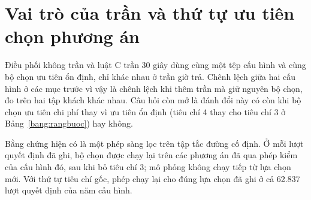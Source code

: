 
\section{Vai trò của trần và thứ tự ưu tiên chọn phương án}
\label{muc:c4-vaitro}

Điều phối không trần và luật C trần 30 giây dùng cùng một tệp cấu hình và cùng bộ chọn ưu tiên ổn định, chỉ
khác nhau ở trần giờ trả. Chênh lệch giữa hai cấu hình ở các mục trước vì vậy là chênh lệch khi thêm trần mà giữ
nguyên bộ chọn, đo trên hai tập khách khác nhau. Câu hỏi còn mở là đánh đổi này có còn khi bộ chọn ưu tiên chi phí
thay vì ưu tiên ổn định (tiêu chí 4 thay cho tiêu chí 3 ở Bảng~\ref{bang:rangbuoc}) hay không.

Bằng chứng hiện có là một phép sàng lọc trên tập tắc đường cố định. Ở mỗi lượt quyết định đã ghi, bộ chọn được
chạy lại trên các phương án đã qua phép kiểm của cấu hình đó, sau khi bỏ tiêu chí 3; mô phỏng không chạy tiếp từ
lựa chọn mới. Với thứ tự tiêu chí gốc, phép chạy lại cho đúng lựa chọn đã ghi ở cả 62.837 lượt quyết định của năm
cấu hình.

